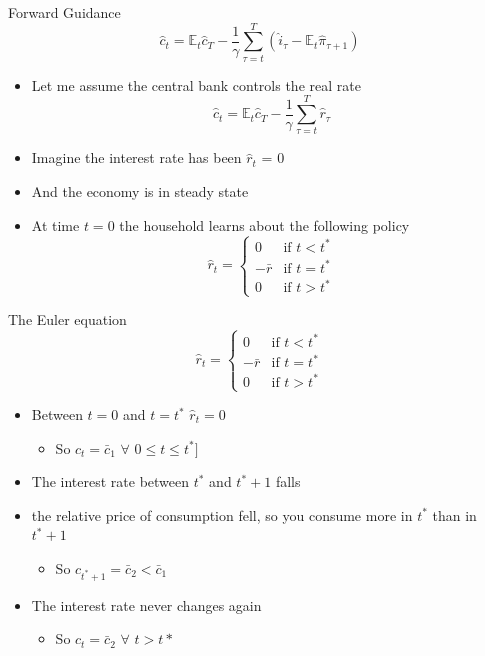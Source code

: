 \documentclass[english,xcolor=svgnames]{beamer}
\begin{document}
\begin{frame}{Forward Guidance}
\[\hat{c}_t = \mathbb{E}_t \hat{c}_{T} - \frac{1}{\gamma} \sum_{\tau = t}^{T} (\hat{i}_{\tau} - \mathbb{E}_t \hat{\pi}_{\tau+1})\]
\begin{itemize}
\item Let me assume the central bank controls the real rate
\[\hat{c}_t = \mathbb{E}_t \hat{c}_{T} - \frac{1}{\gamma} \sum_{\tau = t}^{T} \hat{r}_{\tau} \]
\item Imagine the interest rate has been $\hat{r}_t$ = 0
\item And the economy is in steady state
\item At time $t=0$ the household learns about the following policy
\[
\hat{r}_t = 
\begin{cases}
0 & \text{if $t < t^*$} \\
-\bar{r}& \text{if  $t = t^*$}\\
0 & \text{if $t > t^*$}
\end{cases}
\]
\end{itemize}
\end{frame}

\begin{frame}{The Euler equation}
\[
\hat{r}_t = 
\begin{cases}
0 & \text{if $t < t^*$} \\
-\bar{r}& \text{if  $t = t^*$}\\
0 & \text{if $t > t^*$}
\end{cases}
\]
\begin{itemize}
\item Between $t=0$ and $t=t^*$ $\hat{r}_t = 0$
\begin{itemize}
\item So $c_t = \bar{c}_1$  $\forall$ $ 0 \leq t \leq t^*]$
\end{itemize}
\item The interest rate between $t^*$ and $t^* + 1$ falls
\item the relative price of consumption fell, so you consume more in $t^*$ than in $t^*+1$
\begin{itemize}
\item So $c_{t^*+1} = \bar{c}_2 < \bar{c}_1$
\end{itemize}
\item The interest rate never changes again
\begin{itemize}
\item So $c_{t} = \bar{c}_2$ $\forall$ $t > t*$
\end{itemize}
\end{itemize}
\end{frame}
\end{document}
